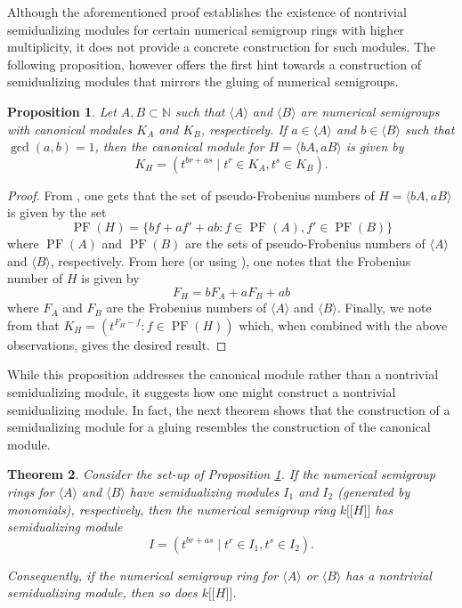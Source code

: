 \documentclass{amsart}
\newcommand{\NN}{\mathbb N}
\newcommand{\ldb}{\mathopen{[\![}} %
\newcommand{\rdb}{\mathclose{]\!]}} %
\theoremstyle{plain}
\newtheorem{theorem}{Theorem}
\newtheorem{prop}[theorem]{Proposition}
\theoremstyle{definition}
\numberwithin{theorem}{section}
\numberwithin{equation}{section}
\numberwithin{equation}{theorem}
\begin{document}
Although the aforementioned proof establishes the existence of nontrivial semidualizing modules for certain numerical semigroup rings with higher multiplicity, it does not provide a concrete construction for such modules. The following proposition, however offers the first hint towards a construction of semidualizing modules that mirrors the gluing of numerical semigroups.

\begin{prop}\label{prop:gluCanon}
Let $A, B \subset \NN$ such that $\langle A \rangle$ and $\langle B \rangle$ are numerical semigroups with canonical modules $K_A$ and $K_B$, respectively. If $a \in \langle A \rangle$ and $b \in  \langle B \rangle$ such that $\gcd(a,b) = 1$, then the canonical module for $H = \langle bA, aB \rangle$ is given by \[K_H = \left( t^{br + as} \mid t^r \in K_A, t^s \in K_B \right).\]
\end{prop}

\begin{proof}
From \cite[Prop 6.6]{N13}, one gets that the set of pseudo-Frobenius numbers of $H = \langle bA, aB \rangle$ is given by the set \[\operatorname{PF}(H) = \{ bf + af' + ab : f \in \operatorname{PF}(A), f' \in \operatorname{PF}(B)\}\] where $\operatorname{PF}(A)$ and $\operatorname{PF}(B)$ are the sets of pseudo-Frobenius numbers of $\langle A \rangle$ and $\langle B \rangle$, respectively. From here (or using \cite[Prop 10(i)]{D76}), one notes that the Frobenius number of $H$ is given by \[F_H = b F_A + a F_B + ab\] where $F_A$ and $F_B$ are the Frobenius numbers of $\langle A \rangle$ and $\langle B \rangle$. Finally, we note from \cite{N13} that $K_H = (t^{F_H - f} : f \in \operatorname{PF}(H))$ which, when combined with the above observations, gives the desired result.
\end{proof}

While this proposition addresses the canonical module rather than a nontrivial semidualizing module, it suggests how one might construct a nontrivial semidualizing module. In fact, the next theorem shows that the construction of a semidualizing module for a gluing resembles the construction of the canonical module.

\begin{theorem}\label{thm:semidualglue}
Consider the set-up of Proposition \ref{prop:gluCanon}. If the numerical semigroup rings  for $\langle A \rangle$ and $\langle B \rangle$ have semidualizing modules $I_1$ and $I_2$ (generated by monomials), respectively, then the numerical semigroup ring $k \ldb H \rdb$ has semidualizing module
\[I=\left( t^{br + as} \mid t^r \in I_1, t^s \in I_2 \right).\]

Consequently, if the numerical semigroup ring for $\langle A \rangle$ or $\langle B \rangle$ has a nontrivial semidualizing module, then so does $k \ldb H \rdb$.
\end{theorem}
\end{document}

